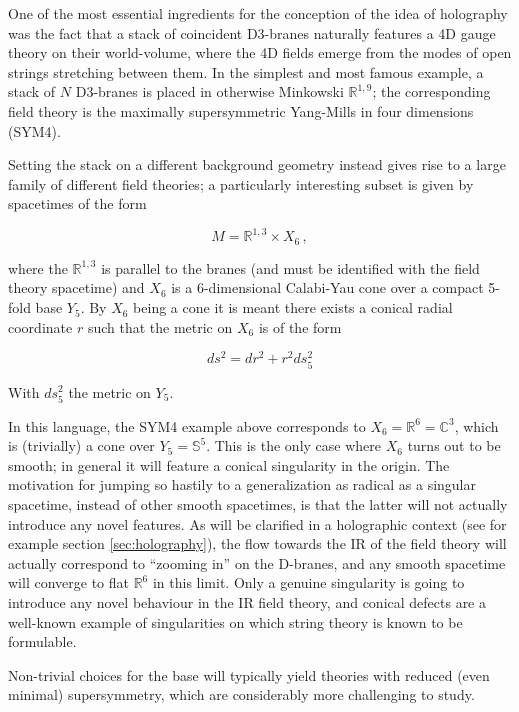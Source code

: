 \label{chap:cones}One of the most essential ingredients for the conception of the idea of holography was the fact that a stack of coincident D3-branes naturally features a 4D gauge theory on their world-volume, where the 4D fields emerge from the modes of open strings stretching between them. In the simplest and most famous example, a stack of $N$ D3-branes is placed in otherwise Minkowski $\mathbb{R}^{1,9}$; the corresponding field theory is the maximally supersymmetric Yang-Mills in four dimensions (SYM4).

Setting the stack on a different background geometry instead gives rise to a large family of different field theories; a particularly interesting subset is given by spacetimes of the form

\begin{equation} 
	M = \mathbb{R}^{1,3} \times X_6 \,,
\end{equation}

where the $\mathbb{R}^{1,3}$ is parallel to the branes (and must be identified with the field theory spacetime) and $X_6$ is a 6-dimensional Calabi-Yau cone over a compact 5-fold base $Y_5$. By $X_6$ being a cone it is meant there exists a conical radial coordinate $r$ such that the metric on $X_6$ is of the form

\begin{equation}
	ds^2 = dr^2 + r^2 ds_5^2
	\label{}
\end{equation}

With $ds_5^2$ the metric on $Y_5$.

In this language, the SYM4 example above corresponds to $X_6 = \mathbb{R}^6 = \mathbb{C}^3$, which is (trivially) a cone over $Y_5 = \mathbb{S}^5$. This is the only case where $X_6$ turns out to be smooth; in general it will feature a conical singularity in the origin. The motivation for jumping so hastily to a generalization as radical as a singular spacetime, instead of other smooth spacetimes, is that the latter will not actually introduce any novel features. As will be clarified in a holographic context (see for example section \ref{sec:holography}), the flow towards the IR of the field theory will actually correspond to ``zooming in'' on the D-branes, and any smooth spacetime will converge to flat $\mathbb{R}^6$ in this limit. Only a genuine singularity is going to introduce any novel behaviour in the IR field theory, and conical defects are a well-known example of singularities on which string theory is known to be formulable\cite{idk}.

Non-trivial choices for the base will typically yield theories with reduced (even minimal) supersymmetry, which are considerably more challenging to study.

